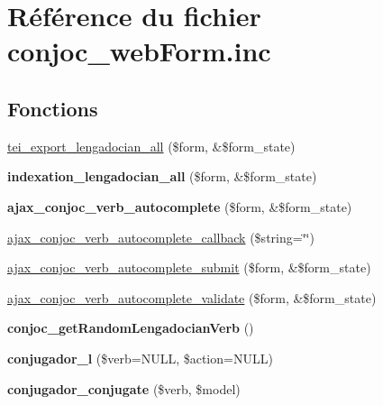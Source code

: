 \hypertarget{conjoc__webForm_8inc}{}\section{Référence du fichier conjoc\+\_\+web\+Form.\+inc}
\label{conjoc__webForm_8inc}
\subsection*{Fonctions}
\begin{DoxyCompactItemize}
\item 
\hyperlink{conjoc__webForm_8inc_a9c7725a828c1a44761bc51fe7a346215}{tei\+\_\+export\+\_\+lengadocian\+\_\+all} (\$form, \&\$form\+\_\+state)
\item 
\hypertarget{conjoc__webForm_8inc_a465cce16b0d09f364ccb546c46c82306}{}\label{conjoc__webForm_8inc_a465cce16b0d09f364ccb546c46c82306} 
{\bfseries indexation\+\_\+lengadocian\+\_\+all} (\$form, \&\$form\+\_\+state)
\item 
\hypertarget{conjoc__webForm_8inc_a3698c970fd73cda200a3a459dc50beec}{}\label{conjoc__webForm_8inc_a3698c970fd73cda200a3a459dc50beec} 
{\bfseries ajax\+\_\+conjoc\+\_\+verb\+\_\+autocomplete} (\$form, \&\$form\+\_\+state)
\item 
\hyperlink{conjoc__webForm_8inc_a5ea54e98ecadf55b7fe917fe6237a52e}{ajax\+\_\+conjoc\+\_\+verb\+\_\+autocomplete\+\_\+callback} (\$string=\char`\"{}\char`\"{})
\item 
\hyperlink{conjoc__webForm_8inc_add934c4187ded056db9c8369764a51ed}{ajax\+\_\+conjoc\+\_\+verb\+\_\+autocomplete\+\_\+submit} (\$form, \&\$form\+\_\+state)
\item 
\hyperlink{conjoc__webForm_8inc_ae85a92c4f091005289a97fb20b8762ef}{ajax\+\_\+conjoc\+\_\+verb\+\_\+autocomplete\+\_\+validate} (\$form, \&\$form\+\_\+state)
\item 
\hypertarget{conjoc__webForm_8inc_aacc782a067b5e8fdaeca34be9a282c61}{}\label{conjoc__webForm_8inc_aacc782a067b5e8fdaeca34be9a282c61} 
{\bfseries conjoc\+\_\+get\+Random\+Lengadocian\+Verb} ()
\item 
\hypertarget{conjoc__webForm_8inc_aab99a7a60692cf7228d4a79924c32cb2}{}\label{conjoc__webForm_8inc_aab99a7a60692cf7228d4a79924c32cb2} 
{\bfseries conjugador\+\_\+l} (\$verb=N\+U\+LL, \$action=N\+U\+LL)
\item 
\hypertarget{conjoc__webForm_8inc_a5d341264c049e9bda5fd2d0acce4dfd7}{}\label{conjoc__webForm_8inc_a5d341264c049e9bda5fd2d0acce4dfd7} 
{\bfseries conjugador\+\_\+conjugate} (\$verb, \$model)

\end{DoxyCompactItemize}
